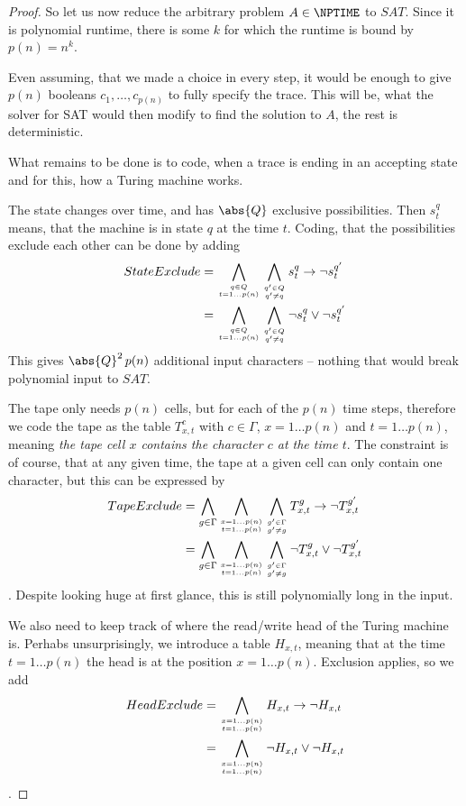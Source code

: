 \begin{proof}
	So let us now reduce the arbitrary problem $A\in\NPTIME$ to $SAT$. Since it 
	is polynomial runtime, there is some $k$ for which the runtime is bound by 
	$p(n) = n^k$.

	Even assuming, that we made a choice in every step, it would be enough to
	give $p(n)$ booleans $c_1, \dots, c_{p(n)}$ to fully specify the trace. This
	will be, what the solver for SAT would then modify to find the solution to
	$A$, the rest is deterministic. 

	What remains to be done is to code, when a trace is ending in an accepting 
	state and for this, how a Turing machine works. %

	The state changes over time, and has $\abs{Q}$ exclusive possibilities.
	Then $s^q_{t}$ means, that the machine is in state $q$ at the time $t$. 
	Coding, that the possibilities exclude each other can be done by adding 
	\begin{align}
		StateExclude &= \bigwedge_{q\in Q \atop t=1\ldots p(n)}{
		\bigwedge_{q'\in Q\atop q' \neq q}{s^q_{t} \rightarrow \lnot 
		s^{q'}_{t} }}\\
		&= \bigwedge_{q\in Q \atop t=1\ldots p(n)} 
		\bigwedge_{q'\in Q\atop q' \neq q} \lnot s^q_{t} \vee \lnot 
		s^{q'}_{t}
	\end{align}
	This gives $\abs{Q}^2\,p(n)$ additional input characters -- nothing that would 
	break polynomial input to $SAT$.

	The tape only needs $p(n)$ cells, but for each of the $p(n)$ time steps, 
	therefore we code the tape as the table $T^c_{x, t}$ with $c\in\Gamma$, 
	$x = 1\ldots p(n)$ and $t=1\ldots p(n)$, meaning \emph{the tape cell $x$ 
	contains the character $c$ at the time $t$}. The constraint is of course, 
	that at any given time, the tape at a given cell can only contain one 
	character, but this can be expressed by
	\begin{align}
		TapeExclude &= \bigwedge_{g\in \Gamma}\bigwedge_{x=1\ldots p(n) \atop t=1\ldots p(n)}
		\bigwedge_{g'\in \Gamma\atop g' \neq g}{T^g_{x,t} \rightarrow \lnot 
		T^{g'}_{x,t} }\\
		&= \bigwedge_{g\in \Gamma}\bigwedge_{x=1\ldots p(n) \atop t=1\ldots p(n)} 
		\bigwedge_{g'\in \Gamma\atop g' \neq g} \lnot T^g_{x,t} \vee \lnot 
		T^{g'}_{x,t}
	\end{align}.
	Despite looking huge at first glance, this is still polynomially long in the input.

	We also need to keep track of where the read/write head of the Turing 
	machine is. Perhabs unsurprisingly, we introduce a table $H_{x,t}$, meaning 
	that at the time $t=1\ldots p(n)$ the head is at the position 
	$x=1\ldots p(n)$. Exclusion applies, so we add
	\begin{align}
		HeadExclude &= \bigwedge_{x=1\ldots p(n) \atop t=1\ldots p(n)}
		{H_{x,t} \rightarrow \lnot H_{x,t} }\\
		&= \bigwedge_{x=1\ldots p(n) \atop t=1\ldots p(n)} \lnot H_{x,t} \vee \lnot 
		H_{x,t}
	\end{align}.


\end{proof}
